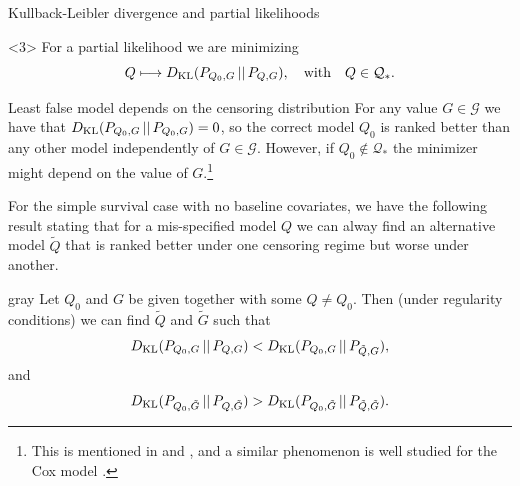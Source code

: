 \documentclass[smaller]{beamer}\usepackage{listings}
\begin{document}
\begin{frame}[label={sec:orgc7dccd3}]{Kullback-Leibler divergence and partial likelihoods}
\begin{onlyenv}<3>
For a partial likelihood we are minimizing
\begin{equation*}
  Q \longmapsto D_{\mathrm{KL}}(P_{Q_0,G} \, || \, P_{Q,G}),
  \quad \text{with} \quad Q \in \mathcal{Q}_*.
\end{equation*}
\color{black}

\vfill

\end{onlyenv}
\end{frame}

\begin{frame}[label={sec:orgd60bf73}]{Least false model depends on the censoring distribution}
\small For any value \(G \in \mathcal{G}\) we have that \(D_{\mathrm{KL}}(P_{Q_0,G} \, || \, P_{Q_0,G}) = 0\), so
the correct model \(Q_0\) is ranked better than any other model independently of \(G \in \mathcal{G}\).
However, if \(Q_0 \not \in \mathcal{Q}_*\) the minimizer might depend on the value of \(G\).\footnote{This is mentioned in \cite{whitney2019comment} and \cite{van2003unicv}, and a similar
phenomenon is well studied for the Cox model
\citep{struthers1986misspecified,hjort1992inference,fine2002comparing}.}

\vfill \pause

For the simple survival case with no baseline covariates, we have the following result stating that
for a mis-specified model \(Q\) we can alway find an alternative model \(\tilde Q\) that is ranked
better under one censoring regime but worse under another.

\vfill


\begin{beamercolorbox}[rounded=true]{gray}
Let $Q_0$ and $G$ be given together with some $Q \not = Q_0$. Then (under
regularity conditions) we can find $\tilde Q$ and $\tilde G$ such
that
\begin{equation*}
  D_{\mathrm{KL}}(P_{Q_0, G} \, || \, P_{Q, G}) < D_{\mathrm{KL}}(P_{Q_0, G} \, || \, P_{\tilde Q, G}),
\end{equation*}
and
\begin{equation*}
  D_{\mathrm{KL}}(P_{Q_0, \tilde G} \, || \, P_{Q, \tilde G}) > D_{\mathrm{KL}}(P_{Q_0, \tilde G} \, || \, P_{\tilde Q,
    \tilde G}).
\end{equation*}
\end{beamercolorbox}
\end{frame}
\end{document}

